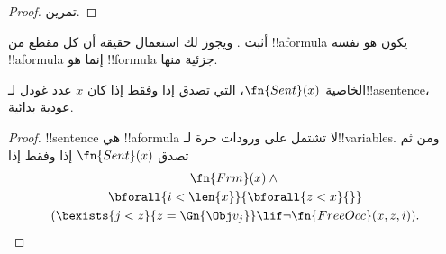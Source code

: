 \documentclass[../../../include/open-logic-section]{subfiles}
\begin{document}
\begin{proof}
تمرين.
\end{proof}

\begin{prob}
أثبت . ويجوز لك استعمال حقيقة
أن كل مقطع من !!a{formula} يكون هو نفسه !!a{formula} إنما هو
!!{formula} جزئية منها.
\end{prob}

\begin{prop}
الخاصية $\fn{Sent}(x)$، التي تصدق إذا وفقط إذا كان $x$ عدد غودل
لـ!!a{sentence}، عودية بدائية.
\end{prop}

\begin{proof}
!!{sentence} هي !!a{formula} لا تشتمل على ورودات حرة لـ!!{variable}s.
ومن ثم تصدق $\fn{Sent}(x)$ إذا وفقط إذا
\begin{multline*}
\fn{Frm}(x) \land {}\\
\bforall{i<\len{x}}{\bforall{z<x}{}}\\
(\bexists{j<z}{z=\Gn{\Obj v_j}} \lif \lnot\fn{FreeOcc}(x,z,i)).
\end{multline*}
\end{proof}
\end{document}
